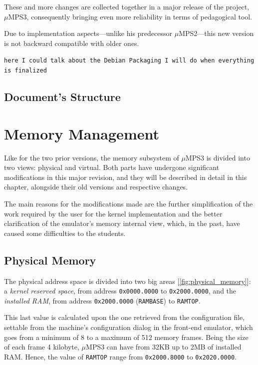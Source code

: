 \documentclass[12pt,a4paper,openright,twoside]{report}
\begin{document}
	These and more changes are collected together in a major release of the project, $\mu$MPS3, consequently bringing even more reliability in terms of pedagogical tool.
	
	Due to implementation aspects---unlike his predecessor $\mu$MPS2---this new version is not backward compatible with older ones.

	\texttt{here I could talk about the Debian Packaging I will do when everything is finalized}
	
\section{Document's Structure}

\chapter{Memory Management}
\lhead[\fancyplain{}{\bfseries\thepage}]{\fancyplain{}{\bfseries\rightmark}}
	Like for the two prior versions, the memory subsystem of $\mu$MPS3 is divided into two views: physical and virtual.
	Both parts have undergone significant modifications in this major revision, and they will be described in detail in this chapter, alongside their old versions and respective changes.
	
	The main reasons for the modifications made are the further simplification of the work required by the user for the kernel implementation and the better clarification of the emulator's memory internal view, which, in the past, have caused some difficulties to the students.

\section{Physical Memory}
	The physical address space is divided into two big areas [\autoref{fig:physical_memory}]: a \textit{kernel reserved space}, from address \texttt{0x0000.0000} to \texttt{0x2000.0000}, and the \textit{installed RAM}, from address \texttt{0x2000.0000} (\texttt{RAMBASE}) to \texttt{RAMTOP}.

	This last value is calculated upon the one retrieved from the configuration file, settable from the machine's configuration dialog in the front-end emulator, which goes from a minimum of 8 to a maximum of 512 memory frames.
	Being the size of each frame 4 kilobyte, $\mu$MPS3 can have from 32KB up to 2MB of installed RAM.
	Hence, the value of \texttt{RAMTOP} range from \texttt{0x2000.8000} to \texttt{0x2020.0000}.
\end{document}
